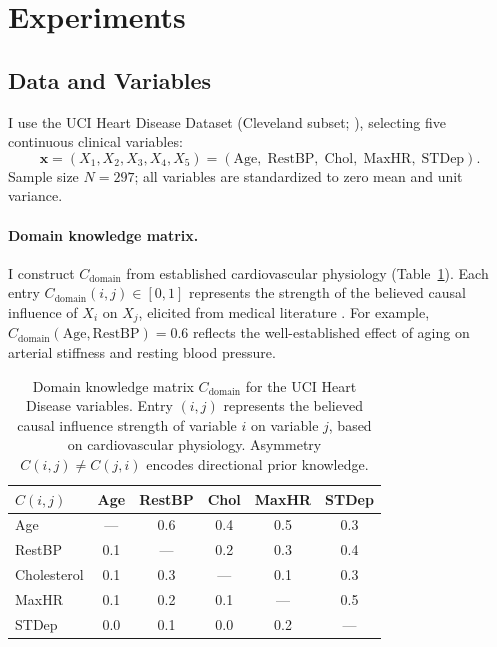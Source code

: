 \documentclass[twoside,11pt]{article}
\newcommand{\bx}{\mathbf{x}}
\begin{document}
\section{Experiments}
\label{sec:experiments}

\subsection{Data and Variables}

I use the UCI Heart Disease Dataset (Cleveland subset;
\citealp{Detrano1989}), selecting five continuous clinical variables:
\[
  \bx = (X_1,X_2,X_3,X_4,X_5)
  = (\text{Age},\;\text{RestBP},\;\text{Chol},\;\text{MaxHR},\;\text{STDep}).
\]
Sample size $N=297$; all variables are standardized to zero mean and unit
variance.

\paragraph{Domain knowledge matrix.}
I construct $C_{\mathrm{domain}}$ from established cardiovascular
physiology (Table~\ref{tab:clinical-knowledge}).  Each entry
$C_{\mathrm{domain}}(i,j)\in[0,1]$ represents the strength of
the believed causal influence of $X_i$ on $X_j$, elicited from
medical literature \citep{Detrano1989}.  For example,
$C_{\mathrm{domain}}(\text{Age},\text{RestBP})=0.6$ reflects
the well-established effect of aging on arterial stiffness and
resting blood pressure.

\begin{table}[t]
\centering
\caption{Domain knowledge matrix $C_{\mathrm{domain}}$ for the UCI
  Heart Disease variables.  Entry $(i,j)$ represents the believed
  causal influence strength of variable $i$ on variable $j$, based
  on cardiovascular physiology.  Asymmetry
  $C(i,j)\ne C(j,i)$ encodes directional prior knowledge.}
\label{tab:clinical-knowledge}
\begin{tabular}{lccccc}
\toprule
$C(i,j)$ & Age & RestBP & Chol & MaxHR & STDep \\
\midrule
Age         & ---  & 0.6  & 0.4  & 0.5  & 0.3 \\
RestBP      & 0.1  & ---  & 0.2  & 0.3  & 0.4 \\
Cholesterol & 0.1  & 0.3  & ---  & 0.1  & 0.3 \\
MaxHR       & 0.1  & 0.2  & 0.1  & ---  & 0.5 \\
STDep       & 0.0  & 0.1  & 0.0  & 0.2  & --- \\
\bottomrule
\end{tabular}
\end{table}
\end{document}
